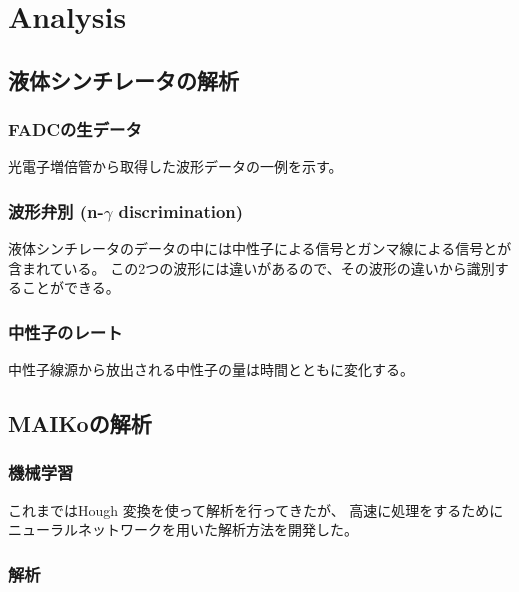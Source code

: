 \chapter{Analysis}
\section{液体シンチレータの解析}
\subsection{FADCの生データ}
光電子増倍管から取得した波形データの一例を示す。

\subsection{波形弁別 (n-$\gamma$ discrimination)}
液体シンチレータのデータの中には中性子による信号とガンマ線による信号とが含まれている。
この2つの波形には違いがあるので、その波形の違いから識別することができる。

\subsection{中性子のレート}
中性子線源から放出される中性子の量は時間とともに変化する。

\section{MAIKoの解析}
\subsection{機械学習}
これまではHough 変換を使って解析を行ってきたが、
高速に処理をするためにニューラルネットワークを用いた解析方法を開発した。

\subsection{解析}


